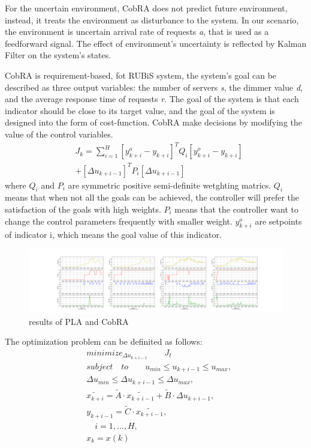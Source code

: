 \documentclass[sigconf]{acmart}
\begin{document}
For the uncertain environment, CobRA does not predict future environment, instead, it treats the environment as disturbance to the system. In our scenario, the environment is uncertain arrival rate of requests \textit{a}, that is used as a feedforward signal. The effect of environment's uncertainty is reflected by Kalman Filter on the system's states.

CobRA is requirement-based, fot RUBiS system, the system's goal can be described as three output variables: the number of servers \textit{s}, the dimmer value \textit{d}, and the average response time of requests \textit{r}.
The goal of the system is that each indicator should be close to its target value, and the goal of the system is designed into the form of cost-function. CobRA make decisions by modifying the value of the control variables.
\begin{equation}
\begin{aligned}
&J_{k}=\sum_{i=1}^H [y_{k+i}^o -y_{k+i}]^TQ_{i}[y_{k+i}^o -y_{k+i}] \\
&+[\Delta u_{k+i-1}]^T P_{i}[\Delta u_{k+i-1}]
\end{aligned}
\end{equation}
where $Q_{i}$ and $P_{i}$ are symmetric positive semi-definite wetghting matrics. $Q_i$ means that when not all the goals can be achieved, the controller will prefer the satisfaction of the goals with high weights. $P_i$ means that the controller want to change the control parameters frequently with smaller weight. $y_{k+i}^o$ are setpoints of indicator i, which means the goal value of this indicator. 
\begin{figure}[h]
	\centering
	\includegraphics[width=\linewidth]{similarity}
	\caption{results of PLA and CobRA}
	\label{similarity}
\end{figure}
The optimization problem can be definited as follows:
\begin{equation}
\begin{aligned}
&minimize_{\Delta u_{k+i-1}}\qquad J_t \\
&subject\quad to \qquad u_{min}\leq u_{k+i-1}\leq u_{max},\\
&{\Delta u_{min}}\leq{ \Delta u_{k+i-1}}\leq {\Delta u_{max}},\\
&\tilde{x_{k+i}}=\tilde{A}\cdot \tilde{x_{k+i-1}}+\tilde{B}\cdot \Delta u_{k+i-1}, \\
&y_{k+i-1}=\tilde{C}\cdot \tilde{x_{k+i-1}},\\
&\quad i=1,...,H,\\
&x_{k}=x(k)
\end{aligned}
\end{equation}
\end{document}
